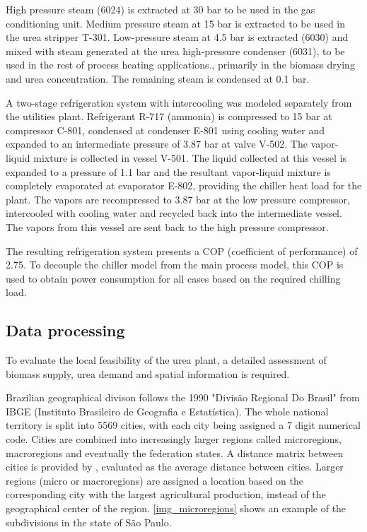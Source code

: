 \documentclass[a4paper, titlepage]{article}
\begin{document}
High pressure steam (6024) is extracted at 30 bar to be used in the gas conditioning unit. Medium pressure steam at 
15 bar is extracted to be used in the urea stripper T-301. Low-pressure steam at 4.5 bar is extracted (6030) and mixed 
with steam generated at the urea high-pressure condenser (6031), to be used in the rest of process heating 
applications., primarily in the biomass drying and urea concentration. The remaining steam is condensed at 0.1 bar.  

A two-stage refrigeration system with intercooling \cite{stoeckerIndustrialRefrigerationHandbook2004} was modeled 
separately from the utilities plant. Refrigerant R-717 (ammonia) is compressed to 15 bar at compressor C-801, 
condensed at condenser E-801 using cooling water and expanded to an intermediate pressure of 3.87 bar at valve V-502. 
The vapor-liquid mixture is collected in vessel V-501. The liquid collected at this vessel is expanded to a pressure
of 1.1 bar and the resultant vapor-liquid mixture is completely evaporated at evaporator E-802, providing the chiller
heat load for the plant. The vapors are recompressed to 3.87 bar at the low pressure compressor, intercooled with 
cooling water and recycled back into the intermediate vessel. The vapors from this vessel are sent back to the 
high pressure compressor.

The resulting refrigeration system presents a COP (coefficient of performance) of 2.75. To decouple the chiller model
from the main process model, this COP is used to obtain power consumption for all cases based on the required chilling
load.

\subsection{Data processing}

To evaluate the local feasibility of the urea plant, a detailed assessment of biomass supply, urea demand and spatial
information is required.

Brazilian geographical divison follows the 1990 "Divisão Regional Do Brasil" from IBGE (Instituto Brasileiro de
Geografia e Estatística). The whole national territory is split into 5569 cities, with each city being assigned a 7 digit
numerical code. Cities are combined into increasingly larger regions called 
microregions, macroregions and eventually the federation states. A distance matrix between cities is provided by
\textcite{carvalhoMatrizesDistanciasTempo2021}, evaluated as the average distance between cities. Larger regions
(micro or macroregions) are assigned a location based on the corresponding city with the largest agricultural production,
instead of the geographical center of the region. \autoref{img_microregions} shows an example of the subdivisions in
the state of São Paulo.
\end{document}
